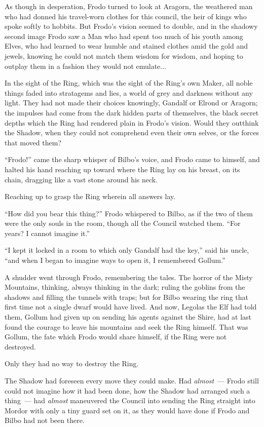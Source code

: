 As though in desperation, Frodo turned to look at Aragorn, the weathered man who had donned his travel-worn clothes for this council, the heir of kings who spoke softly to hobbits. But Frodo's vision seemed to double, and in the shadowy second image Frodo saw a Man who had spent too much of his youth among Elves, who had learned to wear humble and stained clothes amid the gold and jewels, knowing he could not match them wisdom for wisdom, and hoping to outplay them in a fashion they would not emulate...

In the sight of the Ring, which was the sight of the Ring's own Maker, all noble things faded into stratagems and lies, a world of grey and darkness without any light. They had not made their choices knowingly, Gandalf or Elrond or Aragorn; the impulses had come from the dark hidden parts of themselves, the black secret depths which the Ring had rendered plain in Frodo's vision. Would they outthink the Shadow, when they could not comprehend even their own selves, or the forces that moved them?

``Frodo!'' came the sharp whisper of Bilbo's voice, and Frodo came to himself, and halted his hand reaching up toward where the Ring lay on his breast, on its chain, dragging like a vast stone around his neck.

Reaching up to grasp the Ring wherein all answers lay.

``How did you bear this thing?'' Frodo whispered to Bilbo, as if the two of them were the only souls in the room, though all the Council watched them. ``For years? I cannot imagine it.''

``I kept it locked in a room to which only Gandalf had the key,'' said his uncle, ``and when I began to imagine ways to open it, I remembered Gollum.''

A shudder went through Frodo, remembering the tales. The horror of the Misty Mountains, thinking, always thinking in the dark; ruling the goblins from the shadows and filling the tunnels with traps; but for Bilbo wearing the ring that first time not a single dwarf would have lived. And now, Legolas the Elf had told them, Gollum had given up on sending his agents against the Shire, had at last found the courage to leave his mountains and seek the Ring himself. That was Gollum, the fate which Frodo would share himself, if the Ring were not destroyed.

Only they had no way to destroy the Ring.

The Shadow had foreseen every move they could make. Had \emph{almost}~--- Frodo still could not imagine how it had been done, how the Shadow had arranged such a thing~--- had \emph{almost} maneuvered the Council into sending the Ring straight into Mordor with only a tiny guard set on it, as they would have done if Frodo and Bilbo had not been there.

